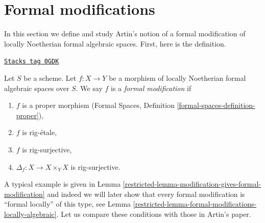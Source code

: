\section{Formal modifications}
\label{restricted-section-formal-modifications}
In this section we define and study Artin's notion of a formal modification
of locally Noetherian formal algebraic spaces. First, here is the
definition.

\begin{definition}
\label{restricted-definition-formal-modification}
\href{https://stacks.math.columbia.edu/tag/0GDK}{\texttt{Stacks tag 0GDK}}

Let $S$ be a scheme. Let $f : X \to Y$ be a morphism of
locally Noetherian formal algebraic spaces over $S$. We say $f$ is a
{\it formal modification} if
\begin{enumerate}
\item $f$ is a proper morphism (Formal Spaces, Definition
\ref{formal-spaces-definition-proper}),
\item $f$ is rig-\'etale,
\item $f$ is rig-surjective,
\item $\Delta_f : X \to X \times_Y X$ is rig-surjective.
\end{enumerate}
\end{definition}

A typical example is given in
Lemma \ref{restricted-lemma-modification-gives-formal-modification}
and indeed we will later show that every formal modification is
``formal locally'' of this type, see
Lemma \ref{restricted-lemma-formal-modifications-locally-algebraic}.
Let us compare these conditions with those in Artin's paper.

